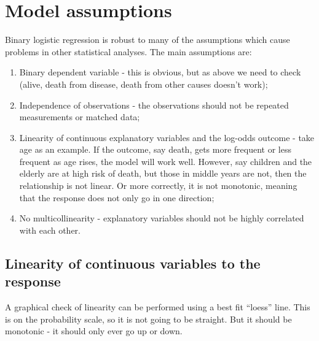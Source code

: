 \documentclass[
  12pt,
  krantz2]{krantz}
\providecommand{\tightlist}{%
  \setlength{\itemsep}{0pt}\setlength{\parskip}{0pt}}
\begin{document}
\hypertarget{model-assumptions}{%
\section{Model assumptions}\label{model-assumptions}}


Binary logistic regression is robust to many of the assumptions which cause problems in other statistical analyses.
The main assumptions are:

\begin{enumerate}
\def\labelenumi{\arabic{enumi}.}
\tightlist
\item
  Binary dependent variable - this is obvious, but as above we need to check (alive, death from disease, death from other causes doesn't work);
\item
  Independence of observations - the observations should not be repeated measurements or matched data;
\item
  Linearity of continuous explanatory variables and the log-odds outcome - take age as an example. If the outcome, say death, gets more frequent or less frequent as age rises, the model will work well. However, say children and the elderly are at high risk of death, but those in middle years are not, then the relationship is not linear. Or more correctly, it is not monotonic, meaning that the response does not only go in one direction;
\item
  No multicollinearity - explanatory variables should not be highly correlated with each other.
\end{enumerate}

\hypertarget{linearity-of-continuous-variables-to-the-response}{%
\subsection{Linearity of continuous variables to the response}\label{linearity-of-continuous-variables-to-the-response}}


A graphical check of linearity can be performed using a best fit ``loess'' line.
This is on the probability scale, so it is not going to be straight.
But it should be monotonic - it should only ever go up or down.
\end{document}
